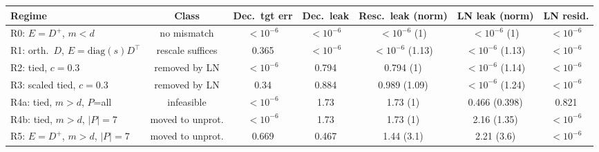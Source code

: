 \begin{tabular}{lcccccc}
\toprule
Regime & Class & Dec.\ tgt err & Dec.\ leak & Resc.\ leak (norm) & LN leak (norm) & LN resid. \\
\midrule
R0: $E{=}D^{+}$, $m{<}d$ & no mismatch & $<\!10^{-6}$ & $<\!10^{-6}$ & $<\!10^{-6}$ (1) & $<\!10^{-6}$ (1) & $<\!10^{-6}$ \\
R1: orth.\ $D$, $E{=}\mathrm{diag}(s)D^{\top}$ & rescale suffices & 0.365 & $<\!10^{-6}$ & $<\!10^{-6}$ (1.13) & $<\!10^{-6}$ (1.13) & $<\!10^{-6}$ \\
R2: tied, $c{=}0.3$ & removed by LN & $<\!10^{-6}$ & 0.794 & 0.794 (1) & $<\!10^{-6}$ (1.14) & $<\!10^{-6}$ \\
R3: scaled tied, $c{=}0.3$ & removed by LN & 0.34 & 0.884 & 0.989 (1.09) & $<\!10^{-6}$ (1.24) & $<\!10^{-6}$ \\
R4a: tied, $m{>}d$, $P$=all & infeasible & $<\!10^{-6}$ & 1.73 & 1.73 (1) & 0.466 (0.398) & 0.821 \\
R4b: tied, $m{>}d$, $|P|{=}7$ & moved to unprot. & $<\!10^{-6}$ & 1.73 & 1.73 (1) & 2.16 (1.35) & $<\!10^{-6}$ \\
R5: $E{=}D^{+}$, $m{>}d$, $|P|{=}7$ & moved to unprot. & 0.669 & 0.467 & 1.44 (3.1) & 2.21 (3.6) & $<\!10^{-6}$ \\
\bottomrule
\end{tabular}
